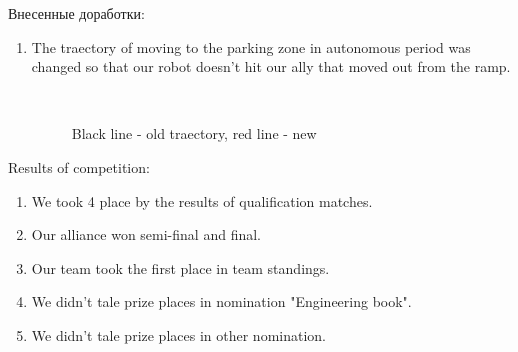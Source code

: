 Внесенные доработки:
\begin{enumerate}
	\item The traectory of moving to the parking zone in autonomous period was changed so that our robot doesn't hit our ally that moved out from the ramp.
	\begin{figure}[H]
		\begin{minipage}[h]{0.2\linewidth}
			\center  
		\end{minipage}
		\begin{minipage}[h]{0.6\linewidth}
			\caption{Black line - old traectory, red line - new}
		\end{minipage}
	\end{figure}
	
\end{enumerate}

Results of competition:
\begin{enumerate}
	\item We took 4 place by the results of qualification matches.
	
	\item Our alliance won semi-final and final.
	
	\item Our team took the first place in team standings.
	
	\item We didn't tale prize places in nomination "Engineering book".
	
	\item We didn't tale prize places in other nomination.
\end{enumerate}

